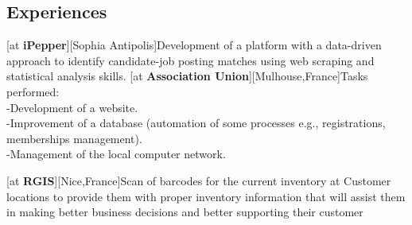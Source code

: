 \documentclass[a4paper]{hamza-cv}
\begin{document}
\begin{textblock}{20.5}
\begin{minipage}[t]{0.61\textwidth}


    \section{Experiences}
    
          \begin{rightenv}
      
        [at \textbf{iPepper}][Sophia Antipolis]{Development of a platform with a data-driven approach to identify candidate-job posting matches using web scraping and statistical analysis skills. }
        [at \textbf{Association Union}][Mulhouse,France]{Tasks performed:\\
        -Development of a website.\\
        -Improvement of a database (automation of some processes e.g., registrations, memberships management).\\
        -Management of the local computer network.}
        
       [at \textbf{RGIS}][Nice,France]{Scan of barcodes for the current inventory at Customer locations to provide them with proper inventory information that will assist them in making better business decisions and better supporting their customer}
      \end{rightenv}



\end{minipage}
\end{textblock}
\end{document}
